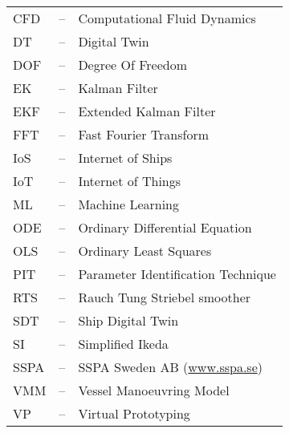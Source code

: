 
\begin{tabular}{ l c l }
CFD & -- & Computational Fluid Dynamics\\
DT  & -- & Digital Twin\\
DOF & -- & Degree Of Freedom\\
EK & -- & Kalman Filter \\
EKF & -- & Extended Kalman Filter \\
FFT & -- & Fast Fourier Transform\\
IoS & -- & Internet of Ships \\
IoT & -- & Internet of Things \\
ML & -- & Machine Learning \\
ODE & -- & Ordinary Differential Equation\\
OLS & -- & Ordinary Least Squares\\
PIT & -- & Parameter Identification Technique\\
RTS & -- & Rauch Tung Striebel smoother \\
SDT  & -- & Ship Digital Twin\\
SI  & -- & Simplified Ikeda\\
SSPA & -- & SSPA Sweden AB (\url{www.sspa.se})\\
VMM & -- & Vessel Manoeuvring Model\\
VP & -- & Virtual Prototyping \\
\end{tabular}
